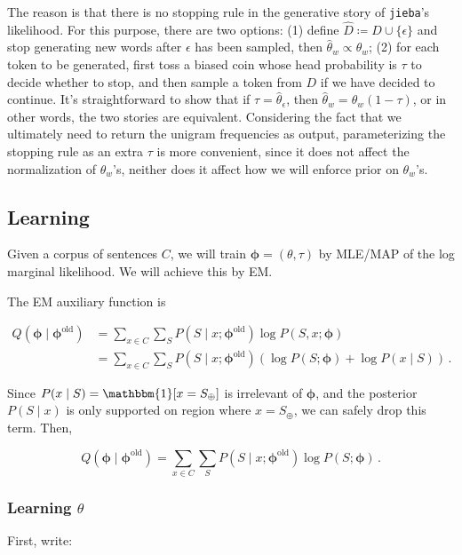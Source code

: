 \documentclass{article}
\newcommand{\jb}{\texttt{jieba}}
\begin{document}
The reason is that there is no stopping rule in the generative story of \jb's likelihood.
For this purpose, there are two options:
(1) define $\hat{D} \coloneqq D \cup \{\epsilon\}$ and stop generating new words after $\epsilon$ has been sampled, then $\hat{\theta}_w \propto \theta_w$;
(2) for each token to be generated, first toss a biased coin whose head probability is $\tau$ to decide whether to stop, and then sample a token from $D$ if we have decided to continue.
It's straightforward to show that if $\tau = \hat{\theta}_\epsilon$, then $\hat{\theta}_w = \theta_w (1-\tau)$, or in other words, the two stories are equivalent.
Considering the fact that we ultimately need to return the unigram frequencies as output, parameterizing the stopping rule as an extra $\tau$ is more convenient, since it does not affect the normalization of $\theta_w$'s, neither does it affect how we will enforce prior on $\theta_w$'s.

\subsection{Learning}
Given a corpus of sentences $C$, we will train $\boldsymbol\phi = (\theta, \tau)$ by MLE/MAP of the log marginal likelihood.
We will achieve this by EM.

The EM auxiliary function is

\[
    \begin{aligned}
        Q(\boldsymbol\phi \mid \boldsymbol\phi^\mathrm{old})
        &= \sum_{x \in C} \sum_S P(S \mid x; \boldsymbol\phi^\mathrm{old}) \log P(S, x; \boldsymbol\phi)\\
        &= \sum_{x \in C} \sum_S P(S \mid x; \boldsymbol\phi^\mathrm{old}) (\log P(S; \boldsymbol\phi) + \log P(x \mid S))\,.
    \end{aligned}
\]

\noindent
Since $P(x \mid S) = \mathbbm{1}[x = S_\oplus]$ is irrelevant of $\boldsymbol\phi$, and the posterior $P(S \mid x)$ is only supported on region where $x = S_\oplus$, we can safely drop this term.
Then,

\begin{equation}\label{eq:em-aux}
    Q(\boldsymbol\phi \mid \boldsymbol\phi^\mathrm{old})
    = \sum_{x \in C} \sum_S P(S \mid x; \boldsymbol\phi^\mathrm{old}) \log P(S; \boldsymbol\phi)\,.
\end{equation}

\subsubsection{Learning \texorpdfstring{$\theta$}{theta}}
First, write:
\end{document}
